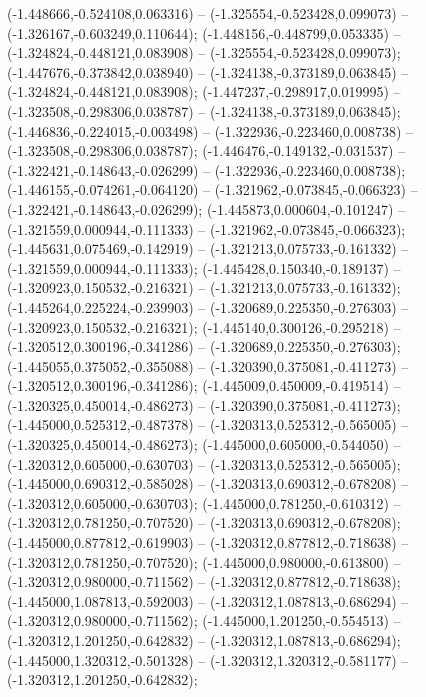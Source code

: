  (-1.448666,-0.524108,0.063316) -- (-1.325554,-0.523428,0.099073) -- (-1.326167,-0.603249,0.110644);
 (-1.448156,-0.448799,0.053335) -- (-1.324824,-0.448121,0.083908) -- (-1.325554,-0.523428,0.099073);
 (-1.447676,-0.373842,0.038940) -- (-1.324138,-0.373189,0.063845) -- (-1.324824,-0.448121,0.083908);
 (-1.447237,-0.298917,0.019995) -- (-1.323508,-0.298306,0.038787) -- (-1.324138,-0.373189,0.063845);
 (-1.446836,-0.224015,-0.003498) -- (-1.322936,-0.223460,0.008738) -- (-1.323508,-0.298306,0.038787);
 (-1.446476,-0.149132,-0.031537) -- (-1.322421,-0.148643,-0.026299) -- (-1.322936,-0.223460,0.008738);
 (-1.446155,-0.074261,-0.064120) -- (-1.321962,-0.073845,-0.066323) -- (-1.322421,-0.148643,-0.026299);
 (-1.445873,0.000604,-0.101247) -- (-1.321559,0.000944,-0.111333) -- (-1.321962,-0.073845,-0.066323);
 (-1.445631,0.075469,-0.142919) -- (-1.321213,0.075733,-0.161332) -- (-1.321559,0.000944,-0.111333);
 (-1.445428,0.150340,-0.189137) -- (-1.320923,0.150532,-0.216321) -- (-1.321213,0.075733,-0.161332);
 (-1.445264,0.225224,-0.239903) -- (-1.320689,0.225350,-0.276303) -- (-1.320923,0.150532,-0.216321);
 (-1.445140,0.300126,-0.295218) -- (-1.320512,0.300196,-0.341286) -- (-1.320689,0.225350,-0.276303);
 (-1.445055,0.375052,-0.355088) -- (-1.320390,0.375081,-0.411273) -- (-1.320512,0.300196,-0.341286);
 (-1.445009,0.450009,-0.419514) -- (-1.320325,0.450014,-0.486273) -- (-1.320390,0.375081,-0.411273);
 (-1.445000,0.525312,-0.487378) -- (-1.320313,0.525312,-0.565005) -- (-1.320325,0.450014,-0.486273);
 (-1.445000,0.605000,-0.544050) -- (-1.320312,0.605000,-0.630703) -- (-1.320313,0.525312,-0.565005);
 (-1.445000,0.690312,-0.585028) -- (-1.320313,0.690312,-0.678208) -- (-1.320312,0.605000,-0.630703);
 (-1.445000,0.781250,-0.610312) -- (-1.320312,0.781250,-0.707520) -- (-1.320313,0.690312,-0.678208);
 (-1.445000,0.877812,-0.619903) -- (-1.320312,0.877812,-0.718638) -- (-1.320312,0.781250,-0.707520);
 (-1.445000,0.980000,-0.613800) -- (-1.320312,0.980000,-0.711562) -- (-1.320312,0.877812,-0.718638);
 (-1.445000,1.087813,-0.592003) -- (-1.320312,1.087813,-0.686294) -- (-1.320312,0.980000,-0.711562);
 (-1.445000,1.201250,-0.554513) -- (-1.320312,1.201250,-0.642832) -- (-1.320312,1.087813,-0.686294);
 (-1.445000,1.320312,-0.501328) -- (-1.320312,1.320312,-0.581177) -- (-1.320312,1.201250,-0.642832);
